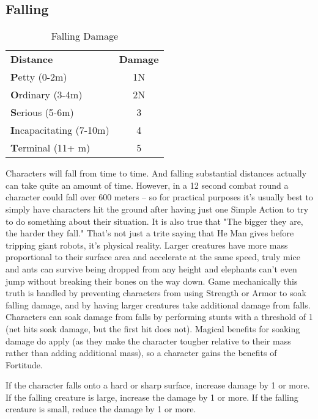 \subsection{Falling}\label{subsection:Falling}

\begin{wraptable}[8]{R}{6cm} \vspace{-.7cm}
 \caption{Falling Damage} \centering
\begin{tabular}{l c}
\textbf{Distance}&\textbf{Damage} \\
\textbf{P}etty (0-2m) & 1N \\
\textbf{O}rdinary (3-4m) & 2N \\
\textbf{S}erious (5-6m) & 3 \\
\textbf{I}ncapacitating (7-10m) & 4 \\
\textbf{T}erminal (11+ m) & 5 \\
\end{tabular}
\end{wraptable}

Characters will fall from time to time. And falling substantial distances actually can take quite an amount of time. However, in a 12 second combat round a character could fall over 600 meters -- so for practical purposes it's usually best to simply have characters hit the ground after having just one Simple Action to try to do something about their situation. It is also true that "The bigger they are, the harder they fall."  That's not just a trite saying that He Man gives before tripping giant robots, it's physical reality. Larger creatures have more mass proportional to their surface area and accelerate at the same speed, truly mice and ants can survive being dropped from any height and elephants can't even jump without breaking their bones on the way down. Game mechanically this truth is handled by preventing characters from using Strength or Armor to soak falling damage, and by having larger creatures take additional damage from falls. Characters can soak damage from falls by performing  stunts with a threshold of 1 (net hits soak damage, but the first hit does not). Magical benefits for soaking damage do apply (as they make the character tougher relative to their mass rather than adding additional mass), so a character gains the benefits of Fortitude.

If the character falls onto a hard or sharp surface, increase damage by 1 or more. If the falling creature is large, increase the damage by 1 or more. If the falling creature is small, reduce the damage by 1 or more.

